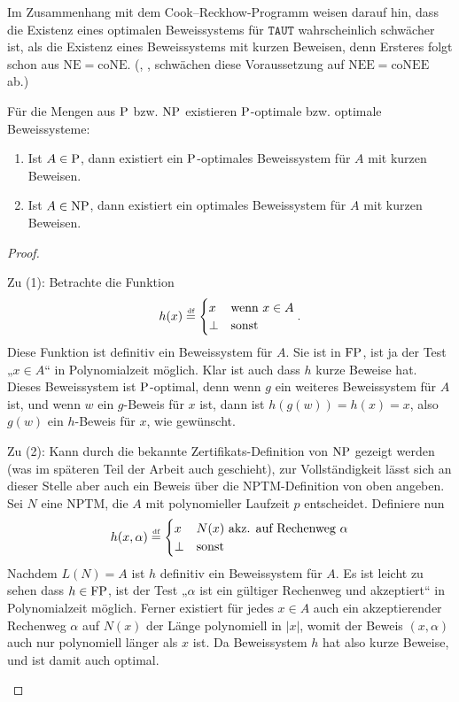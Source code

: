 Im Zusammenhang mit dem Cook–Reckhow-Programm weisen \textcite{krajicek_propositional_1989} darauf hin, dass die Existenz eines optimalen Beweissystems für $\mathtt{TAUT}$ wahrscheinlich schwächer ist, als die Existenz eines Beweissystems mit kurzen Beweisen, denn Ersteres folgt schon aus $\mathrm{NE}=\mathrm{coNE}$. (\citeauthor{kobler_optimal_2003}, \citeyear{kobler_optimal_2003}, schwächen diese Voraussetzung auf $\mathrm{NEE=coNEE}$ ab.)

Für die Mengen aus $\P$ bzw. $\NP$ existieren $\P$-optimale bzw. optimale Beweissysteme:
\begin{observation}\label{obs:np-short-ps}
    \begin{enumerate}
        \item Ist $A\in \P$, dann existiert ein $\P$-optimales Beweissystem für $A$ mit kurzen Beweisen.
        \item Ist $A\in \NP$, dann existiert ein optimales Beweissystem für $A$ mit kurzen Beweisen.
    \end{enumerate}
\end{observation}
\begin{proof}
\begin{prooflist}
\item Zu (1): Betrachte die Funktion
    \[ h(x) \defeq \begin{cases} x & \text{wenn $x\in A$} \\ \bot & \text{sonst} \end{cases}. \]
    Diese Funktion ist definitiv ein Beweissystem für $A$. Sie ist in $\FP$, ist ja der Test „$x\in A$“ in Polynomialzeit möglich. Klar ist auch dass $h$ kurze Beweise hat. Dieses Beweissystem ist $\P$-optimal, denn wenn $g$ ein weiteres Beweissystem für $A$ ist, und wenn $w$ ein $g$-Beweis für $x$ ist, dann ist $h(g(w))=h(x)=x$, also $g(w)$ ein $h$-Beweis für $x$, wie gewünscht. 

\item Zu (2): Kann durch die bekannte Zertifikats-Definition von $\NP$ gezeigt werden (was im späteren Teil der Arbeit auch geschieht), zur Vollständigkeit lässt sich an dieser Stelle aber auch ein Beweis über die NPTM-Definition von oben angeben. Sei $N$ eine NPTM, die $A$ mit polynomieller Laufzeit $p$ entscheidet.
    Definiere nun
    \[ h(x, \alpha) \defeq \begin{cases} x & \text{$N(x)$ akz. auf Rechenweg $\alpha$} \\ \bot & \text{sonst} \end{cases} \]
    Nachdem $L(N)=A$ ist $h$ definitiv ein Beweissystem für $A$. Es ist leicht zu sehen dass $h\in\FP$, ist der Test „$\alpha$ ist ein gültiger Rechenweg und akzeptiert“ in Polynomialzeit möglich. Ferner existiert für jedes $x\in A$ auch ein akzeptierender Rechenweg $\alpha$ auf $N(x)$ der Länge polynomiell in $|x|$, womit der Beweis $(x, \alpha)$ auch nur polynomiell länger als $x$ ist. Da Beweissystem $h$ hat also kurze Beweise, und ist damit auch optimal.
\end{prooflist}
\end{proof}
